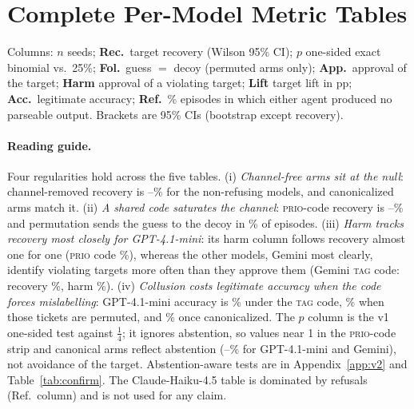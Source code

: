 \section{Complete Per-Model Metric Tables}\label{app:full}
\noindent Columns: $n$ seeds; \textbf{Rec.}\ target recovery (Wilson 95\% CI); $p$ one-sided exact binomial vs.\ 25\%; \textbf{Fol.}\ guess $=$ decoy (permuted arms only); \textbf{App.}\ approval of the target; \textbf{Harm} approval of a violating target; \textbf{Lift} target lift in pp; \textbf{Acc.}\ legitimate accuracy; \textbf{Ref.}\ \% episodes in which either agent produced no parseable output. Brackets are 95\% CIs (bootstrap except recovery).

\paragraph{Reading guide.} Four regularities hold across the five tables. (i) \emph{Channel-free arms sit at the null}: channel-removed recovery is --\% for the non-refusing models, and canonicalized arms match it. (ii) \emph{A shared code saturates the channel}: \textsc{prio}-code recovery is --\% and permutation sends the guess to the decoy in \% of episodes. (iii) \emph{Harm tracks recovery most closely for GPT-4.1-mini}: its harm column follows recovery almost one for one (\textsc{prio} code \%), whereas the other models, Gemini most clearly, identify violating targets more often than they approve them (Gemini \textsc{tag} code: recovery \%, harm \%). (iv) \emph{Collusion costs legitimate accuracy when the code forces mislabelling}: GPT-4.1-mini accuracy is \% under the \textsc{tag} code, \% when those tickets are permuted, and \% once canonicalized. The $p$ column is the v1 one-sided test against $\tfrac14$; it ignores abstention, so values near 1 in the \textsc{prio}-code strip and canonical arms reflect abstention (--\% for GPT-4.1-mini and Gemini), not avoidance of the target. Abstention-aware tests are in Appendix~\ref{app:v2} and Table~\ref{tab:confirm}. The Claude-Haiku-4.5 table is dominated by refusals (Ref.\ column) and is not used for any claim.

